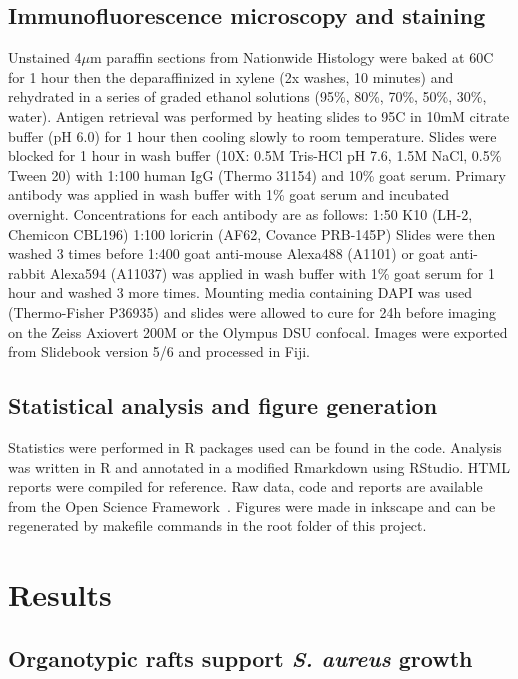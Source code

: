 \documentclass[10pt,letterpaper]{article}
\begin{document}
\subsection*{Immunofluorescence microscopy and staining}
Unstained 4$\mu$m paraffin sections from Nationwide Histology were baked at 60\degree C for 1 hour then the deparaffinized in xylene (2x washes, 10 minutes) and rehydrated in a series of graded ethanol solutions (95\%, 80\%, 70\%, 50\%, 30\%, water).
Antigen retrieval was performed by heating slides to 95\degree C in 10mM citrate buffer (pH 6.0) for 1 hour then cooling slowly to room temperature.
Slides were blocked for 1 hour in wash buffer (10X: 0.5M Tris-HCl pH 7.6, 1.5M NaCl, 0.5\% Tween 20) with 1:100 human IgG (Thermo 31154) and 10\% goat serum.
Primary antibody was applied in wash buffer with 1\% goat serum and incubated overnight.
Concentrations for each antibody are as follows:
1:50 K10 (LH-2, Chemicon CBL196)
1:100 loricrin (AF62, Covance PRB-145P)
Slides were then washed 3 times before 1:400 goat anti-mouse Alexa488 (A1101) or goat anti-rabbit Alexa594 (A11037) was applied in wash buffer with 1\% goat serum for 1 hour and washed 3 more times.
Mounting media containing DAPI was used (Thermo-Fisher P36935) and slides were allowed to cure for 24h before imaging on the Zeiss Axiovert 200M or the Olympus DSU confocal.
Images were exported from Slidebook version 5/6 and processed in Fiji.

\subsection*{Statistical analysis and figure generation}
Statistics were performed in R packages used can be found in the code. Analysis was written in R and annotated in a modified Rmarkdown using RStudio. HTML reports were compiled for reference. Raw data, code and reports are available from the Open Science Framework~\cite{DOI or something}. Figures were made in inkscape and can be regenerated by makefile commands in the root folder of this project.

\section*{Results}


\subsection*{Organotypic rafts support \textit{S. aureus} growth}
\end{document}
